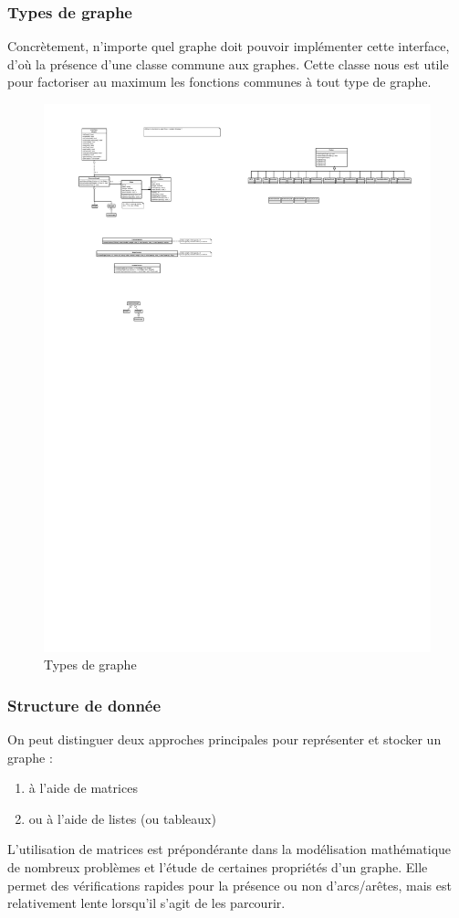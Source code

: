 \documentclass[french]{article}
\begin{document}
			\subsubsection{Types de graphe}
			Concrètement, n'importe quel graphe doit pouvoir implémenter cette interface, d'où la présence d'une classe commune aux graphes. Cette classe nous est utile pour factoriser au maximum les fonctions communes à tout type de graphe.
			\begin{figure}[H]
				\centering
				\includegraphics[scale=3.0]{Conception/typesGraph.pdf}
				\caption{Types de graphe}
			\end{figure}
			
			\subsubsection{Structure de donnée}
			On peut distinguer deux approches principales pour représenter et stocker un graphe :
			\begin{enumerate}
				\item à l'aide de matrices
				\item ou à l'aide de listes (ou tableaux)
			\end{enumerate}	
			L'utilisation de matrices est prépondérante dans la modélisation mathématique de nombreux problèmes et l'étude de certaines propriétés d'un graphe. Elle permet des vérifications rapides pour la présence ou non d'arcs/arêtes, mais est relativement lente lorsqu'il s'agit de les parcourir.
			
\end{document}
